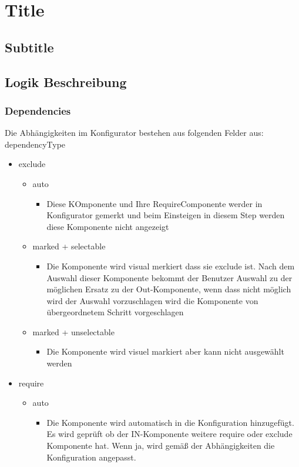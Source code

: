 \documentclass{article}
\begin{document}
\section{Title}

\subsection{Subtitle}

\subsection{Logik Beschreibung}

\subsubsection{Dependencies}

Die Abhängigkeiten im Konfigurator bestehen aus folgenden Felder aus:
dependencyType

\begin{itemize} 
  \item exclude
  \begin{itemize}
    \item auto 
    \begin{itemize}
      \item Diese KOmponente und Ihre RequireComponente werder in Konfigurator
      gemerkt und beim Einsteigen in diesem Step werden diese Komponente nicht
      angezeigt
    
    \end{itemize}
    \item marked + selectable
    \begin{itemize}
      \item Die Komponente wird visual merkiert dass sie exclude ist. Nach dem
      Auswahl dieser Komponente bekommt der Benutzer Auswahl zu der möglichen
      Ersatz zu der Out-Komponente, wenn dass nicht m\"oglich wird der Auswahl
      vorzuschlagen wird die Komponente von \"ubergeordnetem Schritt
      vorgeschlagen
    \end{itemize}
    \item marked + unselectable
    \begin{itemize}
      \item Die Komponente wird visuel markiert aber kann nicht ausgew\"ahlt
     werden
    \end{itemize}
  \end{itemize}
\item require
  \begin{itemize}
    \item auto
    \begin{itemize}
      \item Die Komponente wird automatisch in die Konfiguration hinzugef\"ugt.
      Es wird gepr\"uft ob der IN-Komponente weitere require oder exclude
      Komponente hat. Wenn ja, wird gem\"a\ss{} der Abh\"angigkeiten die
      Konfiguration angepasst.
    \end{itemize}
  \end{itemize}
\end{itemize}
\end{document}
